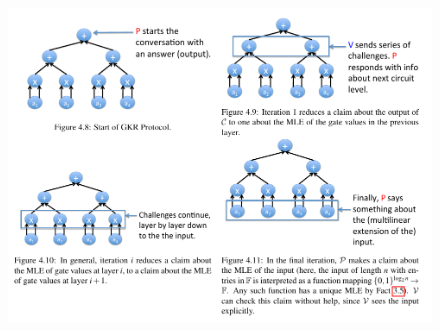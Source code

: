 \documentclass{article}
\begin{document}
\begin{figure}[h] \label{fig:circuit-MLE}
\centering
\includegraphics[scale=0.5]{GKR_02}
\end{figure}
\end{document}
